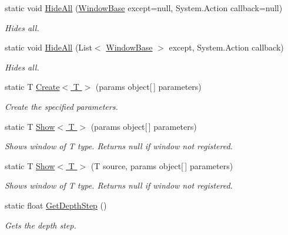 \begin{DoxyCompactItemize}
static void \hyperlink{class_unity_engine_1_1_u_i_1_1_windows_1_1_window_system_a065fe899341eda556bfe9113ecf747dc}{Hide\+All} (\hyperlink{class_unity_engine_1_1_u_i_1_1_windows_1_1_window_base}{Window\+Base} except=null, System.\+Action callback=null)
\begin{DoxyCompactList}\small\item\em Hides all. \end{DoxyCompactList}\item 
static void \hyperlink{class_unity_engine_1_1_u_i_1_1_windows_1_1_window_system_a5a10190e3e2502e7da9e329c46de124e}{Hide\+All} (List$<$ \hyperlink{class_unity_engine_1_1_u_i_1_1_windows_1_1_window_base}{Window\+Base} $>$ except, System.\+Action callback)
\begin{DoxyCompactList}\small\item\em Hides all. \end{DoxyCompactList}\item 
static T \hyperlink{class_unity_engine_1_1_u_i_1_1_windows_1_1_window_system_ace619fa713b4905315c501beba8eaebe}{Create$<$ T $>$} (params object\mbox{[}$\,$\mbox{]} parameters)
\begin{DoxyCompactList}\small\item\em Create the specified parameters. \end{DoxyCompactList}\item 
static T \hyperlink{class_unity_engine_1_1_u_i_1_1_windows_1_1_window_system_a13b9f3a4c5884c3a2b306e018e0cd457}{Show$<$ T $>$} (params object\mbox{[}$\,$\mbox{]} parameters)
\begin{DoxyCompactList}\small\item\em Shows window of T type. Returns null if window not registered. \end{DoxyCompactList}\item 
static T \hyperlink{class_unity_engine_1_1_u_i_1_1_windows_1_1_window_system_ae23390d9127da933af1457a8a1264a81}{Show$<$ T $>$} (T source, params object\mbox{[}$\,$\mbox{]} parameters)
\begin{DoxyCompactList}\small\item\em Shows window of T type. Returns null if window not registered. \end{DoxyCompactList}\item 
static float \hyperlink{class_unity_engine_1_1_u_i_1_1_windows_1_1_window_system_a62b34a53b2a0f997c8f1b618008b2799}{Get\+Depth\+Step} ()
\begin{DoxyCompactList}\small\item\em Gets the depth step. \end{DoxyCompactList}\end{DoxyCompactItemize}
